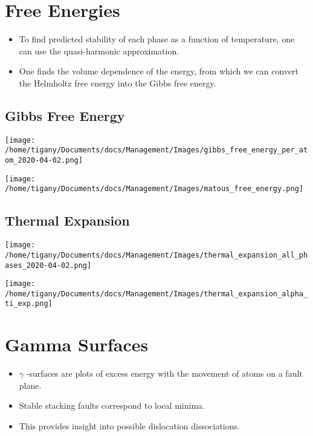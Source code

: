 \documentclass[11pt]{article}
\begin{document}
\section*{Free Energies}
\label{sec:org2dd8063}
\begin{itemize}
\item To find predicted stability of each phase as a function of temperature, one can
use the quasi-harmonic approximation.
\item One finds the volume dependence of the energy, from which we can convert the
Helmholtz free energy into the Gibbs free energy.
\end{itemize}

\subsection*{Gibbs Free Energy}
\label{sec:org2a68e67}
\begin{center}
\texttt{[image: /home/tigany/Documents/docs/Management/Images/gibbs\_free\_energy\_per\_atom\_2020-04-02.png]}
\label{org4758ed3}
\end{center}

\begin{center}
\texttt{[image: /home/tigany/Documents/docs/Management/Images/matous\_free\_energy.png]}
\end{center}


\subsection*{Thermal Expansion}
\label{sec:org132c9ad}
\begin{center}
\texttt{[image: /home/tigany/Documents/docs/Management/Images/thermal\_expansion\_all\_phases\_2020-04-02.png]}
\label{orgb6e7517}
\end{center}


\begin{center}
\texttt{[image: /home/tigany/Documents/docs/Management/Images/thermal\_expansion\_alpha\_ti\_exp.png]}
\end{center}





\section*{Gamma Surfaces}
\label{sec:org9661bea}


\begin{itemize}
\item \(\gamma\) -surfaces are plots of excess energy with the movement of
atoms on a fault plane.
\item Stable stacking faults correspond to local minima.
\item This provides insight into possible dislocation dissociations.
\end{itemize}
\end{document}
